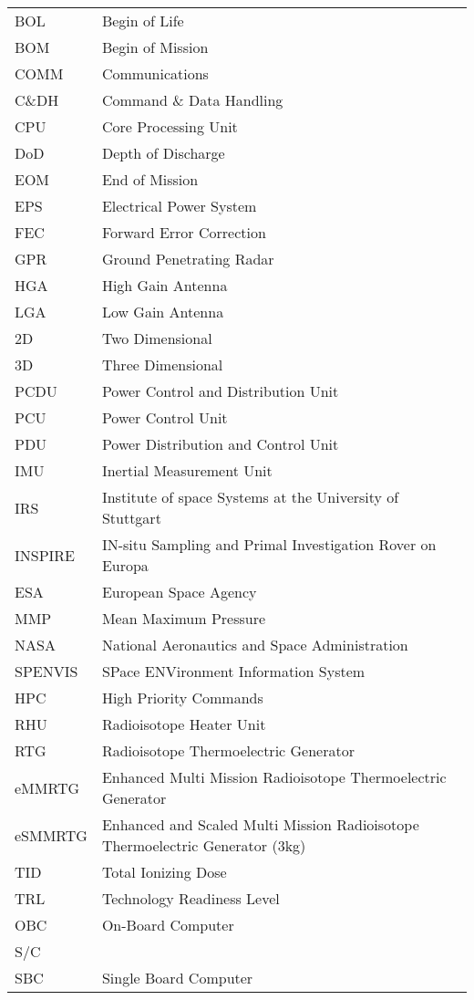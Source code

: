 \begin{longtable}[l]{ll}


BOL     & Begin of Life \\
BOM     & Begin of Mission \\
COMM    & Communications \\
C\&DH	& Command \& Data Handling \\
CPU		& Core Processing Unit \\
DoD     & Depth of Discharge \\
EOM     & End of Mission \\
EPS     & Electrical Power System \\
FEC		& Forward Error Correction \\
GPR		& Ground Penetrating Radar \\
HGA	    & High Gain Antenna \\
LGA		& Low Gain Antenna \\		
2D		& Two Dimensional \\
3D		& Three Dimensional \\
PCDU    & Power Control and Distribution Unit \\
PCU     & Power Control Unit \\
PDU     & Power Distribution and Control Unit \\
IMU     & Inertial Measurement Unit \\
IRS     & Institute of space Systems at the University of Stuttgart \\
INSPIRE & IN-situ Sampling and Primal Investigation Rover on Europa \\
ESA		& European Space Agency	\\
MMP		& Mean Maximum Pressure \\
NASA    &   National Aeronautics and Space Administration \\
SPENVIS	&	SPace ENVironment Information System	\\
HPC     & High Priority Commands \\
RHU		& Radioisotope Heater Unit\\
RTG     & Radioisotope Thermoelectric Generator \\
eMMRTG  & Enhanced Multi Mission Radioisotope Thermoelectric Generator \\
eSMMRTG & Enhanced and Scaled Multi Mission Radioisotope Thermoelectric Generator (3kg) \\
TID		& Total Ionizing Dose \\
TRL     & Technology Readiness Level \\
OBC		& On-Board Computer \\
S/C     \\
SBC		& Single Board Computer \\



\end{longtable}

